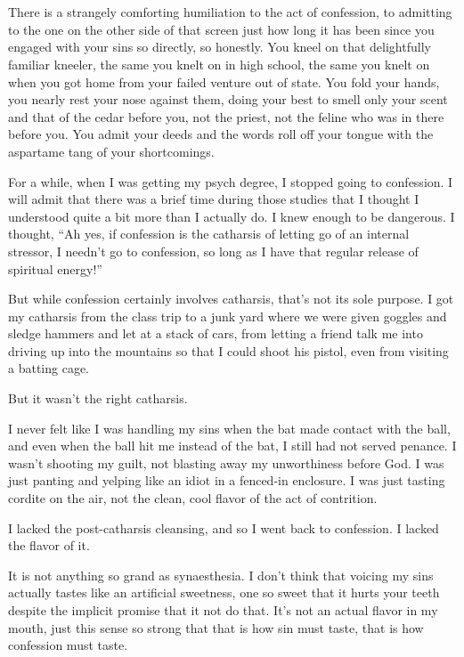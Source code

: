 \section{}

There is a strangely comforting humiliation to the act of confession, to admitting to the one on the other side of that screen just how long it has been since you engaged with your sins so directly, so honestly. You kneel on that delightfully familiar kneeler, the same you knelt on in high school, the same you knelt on when you got home from your failed venture out of state. You fold your hands, you nearly rest your nose against them, doing your best to smell only your scent and that of the cedar before you, not the priest, not the feline who was in there before you. You admit your deeds and the words roll off your tongue with the aspartame tang of your shortcomings.

For a while, when I was getting my psych degree, I stopped going to confession. I will admit that there was a brief time during those studies that I thought I understood quite a bit more than I actually do. I knew enough to be dangerous. I thought, ``Ah yes, if confession is the catharsis of letting go of an internal stressor, I needn't go to confession, so long as I have that regular release of spiritual energy!''

But while confession certainly involves catharsis, that's not its sole purpose. I got my catharsis from the class trip to a junk yard where we were given goggles and sledge hammers and let at a stack of cars, from letting a friend talk me into driving up into the mountains so that I could shoot his pistol, even from visiting a batting cage.

But it wasn't the right catharsis.

I never felt like I was handling my sins when the bat made contact with the ball, and even when the ball hit me instead of the bat, I still had not served penance. I wasn't shooting my guilt, not blasting away my unworthiness before God. I was just panting and yelping like an idiot in a fenced-in enclosure. I was just tasting cordite on the air, not the clean, cool flavor of the act of contrition.

I lacked the post-catharsis cleansing, and so I went back to confession. I lacked the flavor of it.

It is not anything so grand as synaesthesia. I don't think that voicing my sins actually tastes like an artificial sweetness, one so sweet that it hurts your teeth despite the implicit promise that it not do that. It's not an actual flavor in my mouth, just this sense so strong that that is how sin must taste, that is how confession must taste.

